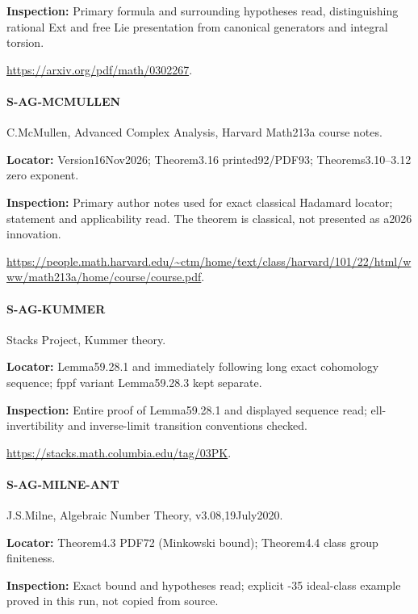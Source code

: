 \documentclass[11pt,a4paper]{article}
\begin{document}
\textbf{Inspection:} Primary formula and surrounding hypotheses read, distinguishing rational Ext and free Lie presentation from canonical generators and integral torsion.\allowbreak{}

\url{https://arxiv.org/pdf/math/0302267}.

\paragraph{S-AG-MCMULLEN} C.\allowbreak{}McMullen, Advanced Complex Analysis, Harvard Math213a course notes.

\textbf{Locator:} Version16Nov2026; Theorem3.\allowbreak{}16 printed92/\allowbreak{}PDF93; Theorems3.\allowbreak{}10–\allowbreak{}3.\allowbreak{}12 zero exponent.

\textbf{Inspection:} Primary author notes used for exact classical Hadamard locator; statement and applicability read.\allowbreak{} The theorem is classical, not presented as a2026 innovation.\allowbreak{}

\url{https://people.math.harvard.edu/~ctm/home/text/class/harvard/101/22/html/www/math213a/home/course/course.pdf}.

\paragraph{S-AG-KUMMER} Stacks Project, Kummer theory.

\textbf{Locator:} Lemma59.\allowbreak{}28.\allowbreak{}1 and immediately following long exact cohomology sequence; fppf variant Lemma59.\allowbreak{}28.\allowbreak{}3 kept separate.

\textbf{Inspection:} Entire proof of Lemma59.\allowbreak{}28.\allowbreak{}1 and displayed sequence read; ell-invertibility and inverse-limit transition conventions checked.\allowbreak{}

\url{https://stacks.math.columbia.edu/tag/03PK}.

\paragraph{S-AG-MILNE-ANT} J.\allowbreak{}S.\allowbreak{}Milne, Algebraic Number Theory, v3.\allowbreak{}08,19July2020.

\textbf{Locator:} Theorem4.\allowbreak{}3 PDF72 (Minkowski bound); Theorem4.\allowbreak{}4 class group finiteness.

\textbf{Inspection:} Exact bound and hypotheses read; explicit -35 ideal-class example proved in this run, not copied from source.\allowbreak{}
\end{document}
